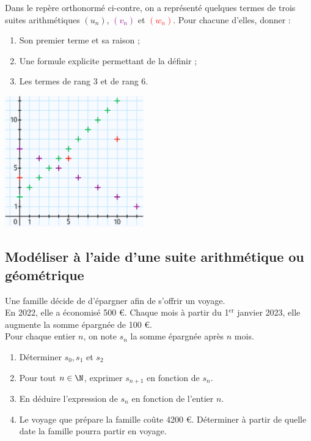 \documentclass[a4paper,11pt,exos]{nsi} %
\begin{document}
\begin{minipage}{10cm}
	\exo{}
	Dans le repère orthonormé ci-contre, on a représenté quelques termes de trois suites arithmétiques \textcolor{ao(english)}{$(u_n)$}, \textcolor{darkmagenta}{$(v_n)$} et \textcolor{red}{$(w_n)$}.
	Pour chacune d'elles, donner :
		\begin{enumerate}
			\item 	Son premier terme et sa raison ;
			\item 	Une formule explicite permettant de la définir ;
			\item	Les termes de rang 3 et de rang 6.
		\end{enumerate}
	
\end{minipage}
\begin{minipage}{7cm}
	\flushright \includegraphics[width=6cm]{repere}
\end{minipage}



\subsection*{Modéliser à l'aide d'une suite arithmétique ou géométrique}

\exo{}
Une famille décide de d'épargner afin de s'offrir un voyage.\\
En 2022, elle a économisé 500 €. Chaque mois à partir du 1$^{\text{er}}$ janvier 2023, elle augmente la somme épargnée de 100 €.\\
Pour chaque entier $n$, on note $s_n$ la somme épargnée après $n$ mois.
\begin{enumerate}
	\item 	Déterminer $s_0, s_1$ et $s_2$
	\item 	Pour tout $n \in \N$, exprimer $s_{n+1}$ en fonction de $s_n$.
	\item	En déduire l'expression de $s_n$ en fonction de l'entier $n$.
	\item	Le voyage que prépare la famille coûte 4200 €. Déterminer à partir de quelle date la famille pourra partir en voyage.
\end{enumerate}
\end{document}
